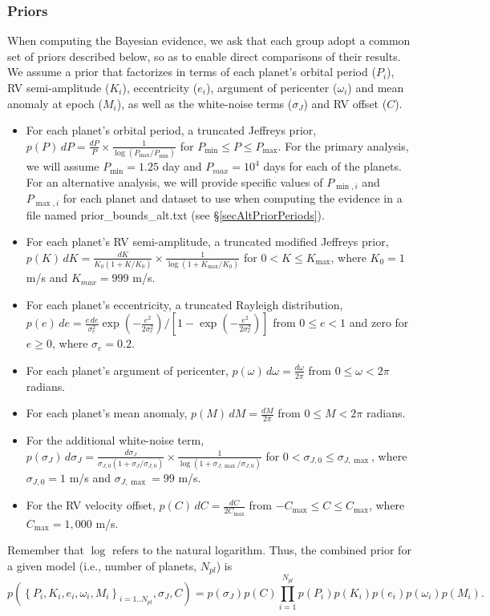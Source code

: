 \documentclass{article}
\begin{document}
\subsubsection{Priors}

When computing the Bayesian evidence, we ask that each group adopt a common set of priors described below, so as to enable direct comparisons of their results.  
We assume a prior that factorizes in terms of each planet's orbital period ($P_i$), RV semi-amplitude ($K_i$), eccentricity ($e_i$), argument of pericenter ($\omega_i$) and mean anomaly at epoch ($M_i$), as well as the white-noise terms ($\sigma_J$) and RV offset ($C$).   
%
\begin{itemize}
\item For each planet's orbital period, a truncated Jeffreys prior, $p(P) \, dP = \frac{dP}{P} \times  \frac{1}{\log(P_{\max}/P_{\min})}$ for $P_{\min} \le P \le P_{\max}$.  For the primary analysis, we will assume $P_{\min}=1.25$ day and $P_{max}=10^4$ days for each of the planets.  For an alternative analysis, we will provide specific values of $P_{\min,i}$ and $P_{\max,i}$ for each planet and dataset to use when computing the evidence in a file named prior\_bounds\_alt.txt (see \S\ref{secAltPriorPeriods}).  
\item For each planet's RV semi-amplitude, a truncated modified Jeffreys prior, $p(K) \, dK = \frac{dK}{K_0(1+K/K_0)} \times  \frac{1}{\log(1+K_{\max}/K_0)}$ for $0<K\le K_{\max}$, where $K_0=1$ m/s and $K_{max}=999$ m/s.
\item For each planet's eccentricity, a truncated Rayleigh distribution, $p(e) \, de = \frac{e\, de}{\sigma_e^2} \exp\left(-\frac{e^2}{2\sigma_e^2}\right) / \left[ 1-\exp\left(-\frac{e^2}{2\sigma_e^2}\right) \right]$ from $0 \leq e < 1$ and zero for $e\ge0$, where $\sigma_e = 0.2$.
\item For each planet's argument of pericenter, $p(\omega) \, d\omega = \frac{d\omega}{2\pi}$ from $0 \leq \omega < 2\pi$ radians.
\item For each planet's mean anomaly, $p(M) \, dM = \frac{dM}{2\pi}$ from $0 \leq M < 2\pi$ radians.
\item For the additional white-noise term, $p(\sigma_J) \, d\sigma_J = \frac{d\sigma_J}{\sigma_{J,0}(1+\sigma_J/\sigma_{J,0})} \times  \frac{1}{\log(1+\sigma_{J,\max}/\sigma_{J,0})}$ for $0<\sigma_{J,0} \le \sigma_{J,\max}$, where $\sigma_{J,0}=1$ m/s and $\sigma_{J,\max}=99$ m/s.
\item For the RV velocity offset, $p(C) \, dC = \frac{dC}{2C_{\max}}$ from $-C_{\max} \le C \le C_{\max}$, where $C_{\max} = 1,000$ m/s.
\end{itemize}
%
Remember that $\log$ refers to the natural logarithm.
Thus, the combined prior for a given model (i.e., number of planets, $N_{pl}$) is
%
\begin{equation}
p\left(\left\{P_i,K_i,e_i,\omega_i,M_i\right\}_{i=1..N_{pl}}, \sigma_J, C \right) =
p(\sigma_J) p(C) \prod_{i=1}^{N_{pl}} p(P_i) p(K_i) p(e_i) p(\omega_i) p(M_i).
\end{equation}
%
\end{document}
